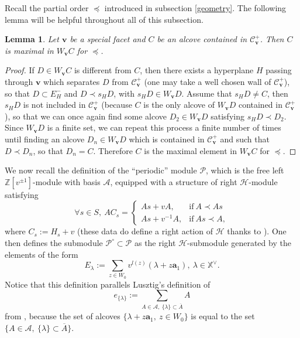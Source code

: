 \documentclass[11pt]{amsart}
\theoremstyle{plain}
\newtheorem{lem}[thm]{Lemma}
\theoremstyle{remark}
\numberwithin{equation}{section}
\begin{document}
	Recall the partial order $\preceq$ introduced in subsection \ref{geometry}. The following lemma will be helpful throughout all of this subsection.
	\begin{lem}\label{lem max coset}
		Let $\mathbf{v}$ be a special facet and $C$ be an alcove contained in $\mathscr{C}^+_{\mathbf{v}}$. Then $C$ is maximal in $W_\mathbf{v}C$ for $\preceq$.
	\end{lem}
	\begin{proof}
		If $D\in W_\mathbf{v}C$ is different from $C$, then there exists a hyperplane $H$ passing through $\mathbf{v}$ which separates $D$ from $\mathscr{C}^+_\mathbf{v}$ (one may take a well chosen wall of $\mathscr{C}^+_\mathbf{v}$), so that $D\subset E^-_H$ and $D\prec s_HD$, with $s_HD\in W_\mathbf{v}D$. Assume that $s_HD\neq C$, then $s_HD$ is not included in $\mathscr{C}^+_{\mathbf{v}}$ (because $C$ is the only alcove of $W_\mathbf{v}D$ contained in $\mathscr{C}^+_{\mathbf{v}}$), so that we can once again find some alcove $D_2\in W_\mathbf{v}D$ satisfying $s_HD\prec D_2$. Since $W_\mathbf{v}D$ is a finite set, we can repeat this process a finite number of times until finding an alcove $D_n\in W_\mathbf{v}D$ which is contained in $\mathscr{C}^+_{\mathbf{v}}$ and such that $D\prec D_n$, so that $D_n=C$. Therefore $C$ is the maximal element in $W_\mathbf{v}C$ for $\preceq$.
	\end{proof}
	We now recall the definition of the ``periodic'' module $\mathcal{P}$, which is the free left $\mathbb{Z}[v^{\pm1}]$-module with basis $\mathcal{A}$, equipped with a structure of right $\mathcal{H}$-module satisfying
	\begin{equation}\label{action hecke alcoves}
		\forall s\in S,~AC_s=
		\begin{cases}
			As+vA, & \text{if}\ A\prec As \\
			As+v^{-1}A, & \text{if}\ As\prec A,
		\end{cases}
	\end{equation}
	where $C_s:=H_s+v$ (these data do define a right action of $\mathcal{H}$ thanks to \cite[Lemma 4.1]{Soergel1997KazhdanLusztigPA}). One then defines the submodule $\mathcal{P}^\circ\subset \mathcal{P}$ as the right $\mathcal{H}$-submodule generated by the elements of the form
	$$E_\lambda:=\sum_{z\in W_0}v^{l(z)}(\lambda+z\mathbf{a}_1),~\lambda\in \mathbb{X}^\vee.$$
	Notice that this definition parallels Lusztig's definition of
	$$e_{\{\lambda\}}:=\sum_{A\in\mathcal{A},~\{\lambda\}\subset \overline{A}}A$$ 
	from \cite[§1.7]{LUSZTIG1980121}, because the set of alcoves $\{\lambda+z\mathbf{a}_1,~z\in W_0\}$ is equal to the set $\{A\in\mathcal{A},~\{\lambda\}\subset \overline{A}\}$.
	
\end{document}
